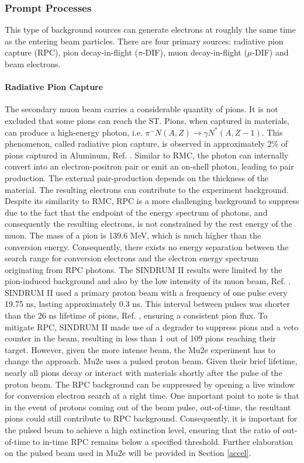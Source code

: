 \subsubsection{Prompt Processes}
This type of background sources can generate electrons at roughly the same time as 
the entering beam particles. There are four primary sources: radiative pion capture (RPC), 
pion decay-in-flight ($\pi$-DIF), muon decay-in-flight ($\mu$-DIF) and beam electrons.
\paragraph{Radiative Pion Capture}
The secondary muon beam carries a considerable quantity of pions.  It is not excluded 
that some pions can reach the ST. Pions, when captured in materials, can 
produce a high-energy photon, i.e. $\pi^- N(A,Z) \rightarrow \gamma N ^* (A,Z-1)$. 
This phenomenon, called radiative pion capture, is observed in approximately 2\% of 
pions captured in Aluminum, Ref. \cite{PhysRevC.5.1867}. Similar to RMC, the photon 
can internally convert into an electron-positron pair or emit an on-shell photon, 
leading to pair production. The external pair-production depends on the thickness 
of the material. The resulting electrons can contribute to the experiment background. 
Despite its similarity to RMC, RPC is a more challenging background to suppress due to 
the fact that the endpoint of the energy spectrum of photons, and consequently the 
resulting electrons, is not constrained by the rest energy of the muon. The mass of 
a pion is 139.6 MeV, which is much higher than the conversion energy. Consequently, 
there exists no energy separation between the search range for conversion electrons 
and the electron energy spectrum originating from RPC photons. The SINDRUM II results 
were limited by the pion-induced background and also by the low intensity of its muon 
beam, Ref. \cite{SINDRUMII:2006dvw}. SINDRUM II used a primary proton beam with a 
frequency of one pulse every 19.75 ns, lasting approximately 0.3 ns. This interval 
between pulses was shorter than the 26 ns lifetime of pions, Ref. \cite{zyla}, 
ensuring a consistent pion flux. To mitigate RPC, SINDRUM II made use of a degrader to suppress 
pions and a veto counter in the beam, resulting in less than 1 out of 109 pions reaching their 
target. However, given the more intense beam, the Mu2e experiment has to change the approach. 
Mu2e uses a pulsed proton beam. Given their brief lifetime, nearly all pions decay or 
interact with materials shortly after the pulse of the proton beam. The RPC background 
can be suppressed by opening a live window for conversion electron search at a right time. 
One important point to note is that in the event of protons coming out of the beam pulse, 
out-of-time, the resultant pions could still contribute to RPC background. Consequently, 
it is important for the pulsed beam to achieve a high extinction level, ensuring that the 
ratio of out-of-time to in-time RPC remains below a specified threshold. Further elaboration 
on the pulsed beam used in Mu2e will be provided in Section \ref{accel}.
